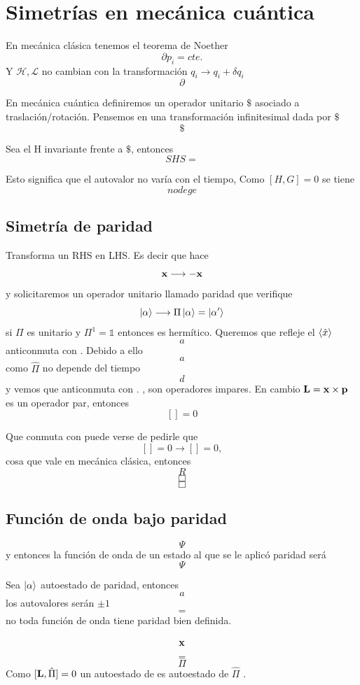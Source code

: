 \documentclass[10pt,oneside]{CBFT_book}
\begin{document}
\section{Simetrías en mecánica cuántica}

En mecánica clásica tenemos el teorema de Noether 
\[
	\partial p_i = cte.
\]
Y $\mathcal{H}, \mathcal{L}$ no cambian con la transformación $q_i \longrightarrow q_i + \delta q_i$
\[
	\partial 
\]

En mecánica cuántica definiremos un operador unitario $\$$ asociado a traslación/rotación. Pensemos en una 
transformación infinitesimal dada por $\$$
\[
	\$
\]

Sea el H invariante frente a $\$$, entonces 
\[
	SHS =
\]

Esto significa que el autovalor no varía con el tiempo, Como $[H,G]=0$ se tiene 
\[
	no dege 
\]

\subsection{Simetría de paridad}

Transforma un RHS en LHS. Es decir que hace 
\[
	\vb{x} \longrightarrow - \vb{x}
\]
y solicitaremos un operador unitario llamado paridad que verifique 
\[
	\Ket{\alpha} \longrightarrow \Pi\Ket{\alpha} = \Ket{\alpha'}
\]
si $\Pi$ es unitario y $\Pi^1=\mathbb{1}$ entonces es hermítico.
Queremos que refleje el $\Braket{\hat{x}}$ 
\[
	a
\]
anticonmuta con .
Debido a ello 
\[
	a
\]
como $\hat{\Pi}$ no depende del tiempo 
\[
	d
\]
y vemos que anticonmuta con .
,  son operadores impares. En cambio $\vb{L}=\vb{x}\times\vb{p}$ es un operador par, entonces 
\[
	[] = 0
\]

Que conmuta con  puede verse de pedirle que 
\[
	[] = 0 \longrightarrow [] = 0 ,
\]
cosa que vale en mecánica clásica, entonces 
\[
	R
\]
\[
	\Box
\]
\[
	\Box
\]

\subsection{Función de onda bajo paridad}

\[
	\Psi
\]
y entonces la función de onda de un estado al que se le aplicó paridad será 
\[
	\Psi
\]

Sea $\Ket{\alpha}$ autoestado de paridad, entonces 
\[
	a
\]
los autovalores serán $\pm 1$
\[
	=
\]
no toda función de onda tiene paridad bien definida.

\[
	\vb{x}
\]
\[
	=
\]
\[
	\Pi
\]
Como $[\vb{L},\hat{\Pi}]=0$ un autoestado de  es autoestado de $\hat{\Pi}$ .
\end{document}
